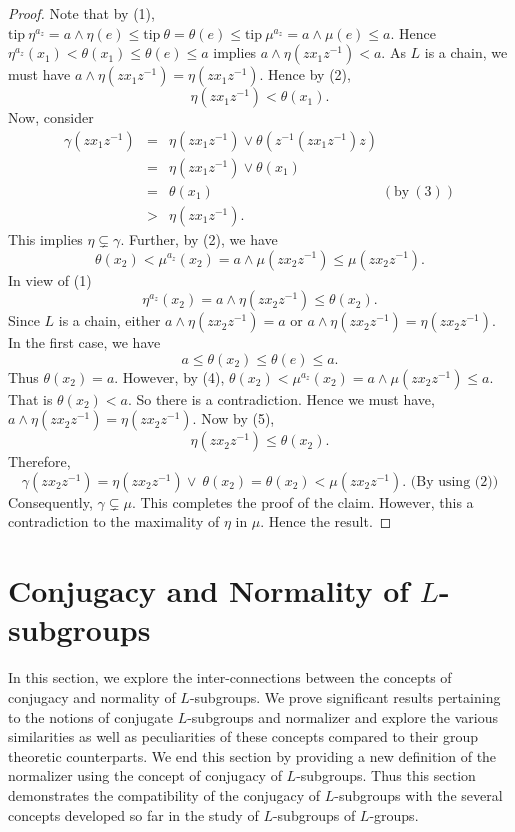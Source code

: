 \documentclass[10pt]{article}
\theoremstyle{plain}
\theoremstyle{definition}
\theoremstyle{remark}
\theoremstyle{case}
\begin{document}
\begin{proof}
Note that by (1), $\text{tip}~\eta^{a_z} =a \wedge \eta(e) \leq \text{tip}~\theta= \theta(e) \leq \text{tip}~ \mu^{a_z}= a \wedge \mu(e) \leq a$. Hence $\eta^{a_z}(x_1) < \theta(x_1) \leq \theta(e) \leq a$ implies $a \wedge \eta(zx_1z^{-1}) < a$. As $L$ is a chain, we must have $a\wedge\eta (zx_1z^{-1})=\eta (zx_1z^{-1})$.  Hence by (2), 
\begin{equation}
\eta (zx_1z^{-1}) < \theta (x_1).
\end{equation}
Now, consider
\begin{eqnarray*}
	\gamma(zx_1z^{-1})&=& \eta(zx_1z^{-1}) \vee \theta(z^{-1}(zx_1z^{-1})z)\\
	&=&\eta (zx_1z^{-1}) \vee \theta(x_1)\\
	&=&\theta(x_1) \qquad\qquad\qquad\qquad\qquad\qquad (\text{by}~(3))\\
	&>& \eta (zx_1z^{-1}).
\end{eqnarray*}
This implies $\eta \subsetneq \gamma$. Further, by (2), we have 
\begin{equation}
\theta(x_2)< \mu^{a_z}(x_2)=a \wedge \mu(zx_2z^{-1})\leq \mu(zx_2z^{-1}).
\end{equation}
In view of (1)
\begin{equation}\eta^{a_z}(x_2) = a \wedge \eta(zx_2z^{-1}) \leq \theta(x_2).\end{equation}
Since $L $ is a chain, either $a \wedge \eta(zx_2z^{-1})=a$ or $a \wedge \eta(zx_2z^{-1})=\eta(zx_2z^{-1})$. In the first case, we have 
\[
a \leq \theta(x_2)\leq \theta(e)\leq a.
\]
Thus $\theta(x_2)=a$. However, by (4), $\theta(x_2)< \mu^{a_z}(x_2)=a \wedge \mu(zx_2z^{-1}) \leq a$. That is $\theta (x_2) <a$. So there is a contradiction. Hence we must have, $a \wedge \eta(zx_2z^{-1})=\eta(zx_2z^{-1})$.  Now by (5),
\[
\eta(zx_2z^{-1})\leq \theta(x_2).
\]
Therefore, 
\[\gamma(zx_2z^{-1}) = \eta (zx_2z^{-1}) \vee \ \theta(x_2)=\theta(x_2)< \mu(zx_2z^{-1}). \text{~(By using (2))}\]
Consequently, $\gamma \subsetneq \mu$. This completes the proof of the claim. However, this a contradiction to the maximality of $\eta$ in $\mu$. Hence the result.

\end{proof}


\section{Conjugacy and Normality of $L$-subgroups}

In this section, we explore the inter-connections between the concepts of conjugacy and normality of $L$-subgroups. We prove significant results pertaining to the notions of conjugate $L$-subgroups and normalizer \cite{ajmal_nor} and explore the various similarities as well as peculiarities of these concepts compared to their group theoretic counterparts. We end this section by providing a new definition of the normalizer using the concept of conjugacy of $L$-subgroups. Thus this section demonstrates the compatibility of the conjugacy of $L$-subgroups with the several concepts developed so far in the study of $L$-subgroups of $L$-groups.
\end{document}
